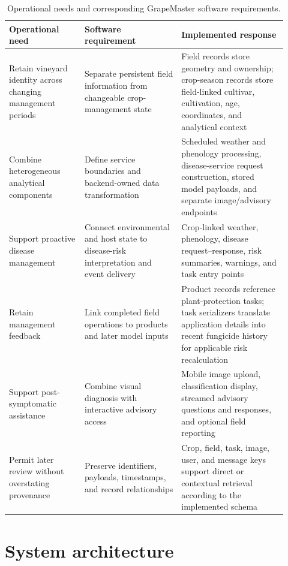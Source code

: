 \documentclass[12pt]{article}
\newcommand{\tablefontsize}{\fontsize{9pt}{11pt}\selectfont}
\begin{document}
\begin{table}[H]
\centering
\caption{Operational needs and corresponding GrapeMaster software requirements.}
\label{tab:software_requirements}
\tablefontsize
\begin{tabular}{@{}p{0.25\linewidth} p{0.32\linewidth} p{0.35\linewidth}@{}}
\toprule
Operational need & Software requirement & Implemented response \\
\midrule
Retain vineyard identity across changing management periods & Separate persistent field information from changeable crop-management state & Field records store geometry and ownership; crop-season records store field-linked cultivar, cultivation, age, coordinates, and analytical context \\
Combine heterogeneous analytical components & Define service boundaries and backend-owned data transformation & Scheduled weather and phenology processing, disease-service request construction, stored model payloads, and separate image/advisory endpoints \\
Support proactive disease management & Connect environmental and host state to disease-risk interpretation and event delivery & Crop-linked weather, phenology, disease request--response, risk summaries, warnings, and task entry points \\
Retain management feedback & Link completed field operations to products and later model inputs & Product records reference plant-protection tasks; task serializers translate application details into recent fungicide history for applicable risk recalculation \\
Support post-symptomatic assistance & Combine visual diagnosis with interactive advisory access & Mobile image upload, classification display, streamed advisory questions and responses, and optional field reporting \\
Permit later review without overstating provenance & Preserve identifiers, payloads, timestamps, and record relationships & Crop, field, task, image, user, and message keys support direct or contextual retrieval according to the implemented schema \\
\bottomrule
\end{tabular}
\end{table}

\section{System architecture}\label{system-architecture}
\end{document}
